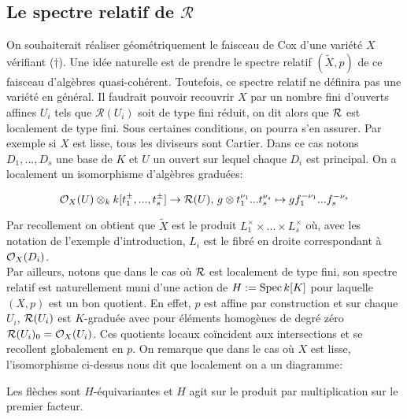 \subsection{Le spectre relatif de $\mathcal{R}$}

On souhaiterait réaliser géométriquement le faisceau de Cox d'une variété $X$ vérifiant ($\dagger$). Une idée naturelle est de prendre le spectre relatif $(\widetilde{X}, p)$ de ce faisceau d'algèbres quasi-cohérent. Toutefois, ce spectre relatif ne définira pas une variété en général. Il faudrait pouvoir recouvrir $X$ par un nombre fini d'ouverts affines $U_i$ tels que $\mathcal{R}(U_i)$ soit de type fini réduit, on dit alors que $\mathcal{R}$ est localement de type fini. Sous certaines conditions, on pourra s'en assurer. Par exemple si $X$ est lisse, tous les diviseurs sont Cartier. Dans ce cas notons $D_1,...,D_s$ une base de $K$ et $U$ un ouvert sur lequel chaque $D_i$ est principal. On a localement un isomorphisme d'algèbres graduées:

$$\mathcal{O}_X(U)\otimes_k k[t_1^{\pm},...,t_s^{\pm}] \rightarrow \mathcal{R}(U),\, g\otimes t_1^{\nu_1}...t_s^{\nu_s}\mapsto gf_1^{-\nu_1}...f_s^{-\nu_s}$$

Par recollement on obtient que $\widetilde{X}$ est le produit $L_1^\times\times...\times L_s^\times$ où, avec les notation de l'exemple d'introduction, $L_i$ est le fibré en droite correspondant à $\mathcal{O}_X(D_i)$.\\
Par ailleurs, notons que dans le cas où $\mathcal{R}$ est localement de type fini, son spectre relatif est naturellement muni d'une action de $H:=\operatorname{Spec} k[K]$ pour laquelle $(X,p)$ est un bon quotient.  En effet, $p$ est affine par construction et sur chaque $U_i$, $\mathcal{R}(U_i)$ est $K$-graduée avec pour éléments homogènes de degré zéro $\mathcal{R}(U_i)_0=\mathcal{O}_X(U_i)$. Ces quotients locaux coïncident aux intersections et se recollent globalement en $p$. On remarque que dans le cas où $X$ est lisse, l'isomorphisme ci-dessus nous dit que localement on a un diagramme:
\begin{center}
\end{center}

Les flèches sont $H$-équivariantes et $H$ agit sur le produit par multiplication sur le premier facteur.

